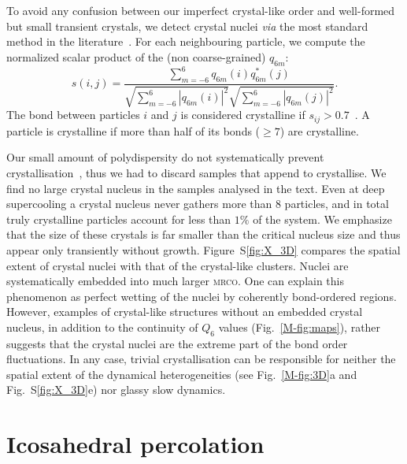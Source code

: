 \documentclass[prl,twocolumn,notitlepage]{revtex4-1}
\begin{document}
To avoid any confusion between our imperfect crystal-like order and well-formed but small transient crystals, we detect crystal nuclei \emph{via} the most standard method in the literature~\cite{ReintenWolde1996, Zaccarelli2009}. For each neighbouring particle, we compute the normalized scalar product of the (non coarse-grained) $q_{6 m}$:
\begin{equation}
	s(i,j) = \frac{
		\sum_{m=-6}^{6} q_{6 m}(i) q_{6 m}^{*}(j)
	}{
		\sqrt{\sum_{m=-6}^{6} |q_{6 m}(i)|^2} \sqrt{\sum_{m=-6}^{6} |q_{6 m}(j)|^2}
	}.
	\label{eq:boo_dot_product}
\end{equation}
The bond between particles $i$ and $j$ is considered crystalline if $s_{ij}>0.7$~\cite{Zaccarelli2009}. A particle is crystalline if more than half of its bonds ($\geq 7$) are crystalline. 

Our small amount of polydispersity do not systematically prevent crystallisation~\cite{Zaccarelli2009}, thus we had to discard samples that append to crystallise. We find no large crystal nucleus in the samples analysed in the text. Even at deep supercooling a crystal nucleus never gathers more than 8 particles, and in total truly crystalline particles account for less than $1\%$ of the system. We emphasize that the size of these crystals is far smaller than the critical nucleus size and thus appear only transiently without growth. Figure~S\ref{fig:X_3D} compares the spatial extent of crystal nuclei with that of the crystal-like clusters. Nuclei are systematically embedded into much larger \textsc{mrco}. One can explain this phenomenon as perfect wetting of the nuclei by coherently bond-ordered regions. However, examples of crystal-like structures without an embedded crystal nucleus, in addition to the continuity of $Q_6$ values (Fig.~\ref{M-fig:maps}), rather suggests that the crystal nuclei are the extreme part of the bond order fluctuations. In any case, trivial crystallisation can be responsible for neither the spatial extent of the dynamical heterogeneities (see Fig.~\ref{M-fig:3D}a and Fig.~S\ref{fig:X_3D}e) nor glassy slow dynamics.

\section*{Icosahedral percolation}
\end{document}
